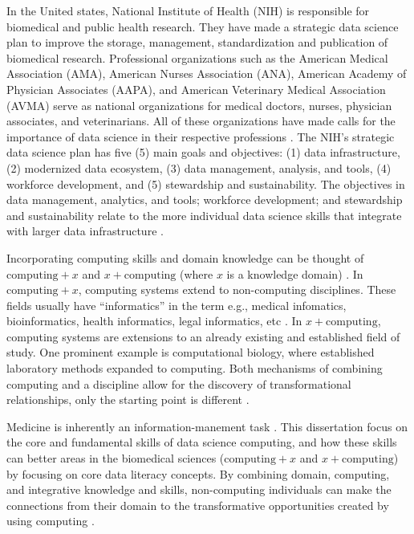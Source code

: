\documentclass[010-intro.tex]{subfiles}
\begin{document}
In the United states,
National Institute of Health (NIH) is responsible for biomedical and public health research.
They have made a strategic data science plan to improve the
storage, management, standardization and publication of biomedical research.
Professional organizations such as the
American Medical Association (AMA),
American Nurses Association (ANA),
American Academy of Physician Associates (AAPA), and
American Veterinary Medical Association (AVMA)
serve as national organizations for medical doctors, nurses, physician associates, and veterinarians.
All of these organizations have made calls for the importance of data science in their respective professions
\cite{payneBiomedicalInformaticsMeets2018, americanmedicalassociationAcceleratingChangeMedical2021, americannursesassociationANAEnterpriseAmerican, owenEthicalIntersectionHealthcare2017, nolenArtificialIntelligenceVeterinary2020, nationalinstitutesofhealthNIHStrategicPlan2020}.
The NIH's strategic data science plan has five (5) main goals and objectives:
(1) data infrastructure,
(2) modernized data ecosystem,
(3) data management, analysis, and tools,
(4) workforce development, and
(5) stewardship and sustainability. %
The objectives in
data management, analytics, and tools;
workforce development;
and stewardship and sustainability
relate to the more individual data science skills that integrate with larger data infrastructure
\cite{nationalinstitutesofhealthNIHStrategicPlan2020}.

Incorporating computing skills and domain knowledge can be thought of
$\text{computing} + x$ and $x + \text{computing}$ (where $x$ is a knowledge domain)
\cite{cc2020}.
In $\text{computing} + x$, computing systems extend to non-computing disciplines.
These fields usually have ``informatics'' in the term
e.g., medical infomatics, bioinformatics, health informatics, legal informatics, etc \cite{CC2020}.
In $x + \text{computing}$,
computing systems are extensions to an already existing and established field of study.
One prominent example is computational biology,
where established laboratory methods expanded to computing.
Both mechanisms of combining computing and a discipline allow for the discovery of transformational relationships,
only the starting point is different \cite{cc2020}.

Medicine is inherently an information-manement task
\cite{shortliffe1993adolescence}.
This dissertation focus on the core and fundamental skills
of data science computing, and how these skills can better areas in the biomedical sciences
($\text{computing} + x$ and $x + \text{computing}$)
by focusing on core data literacy concepts.
By combining domain, computing, and integrative knowledge and skills,
non-computing individuals can make the connections from their domain to the transformative opportunities
created by using computing \cite{cc2020}.
\end{document}
